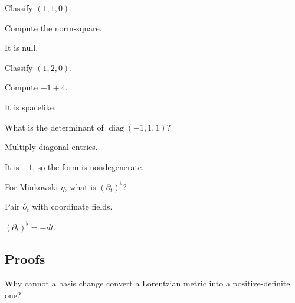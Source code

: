 \begin{exercise}\label{exr:vii29-ped-02}
Classify \((1,1,0)\).
\end{exercise}

\begin{hint}
Compute the norm-square.
\end{hint}

\begin{solution}
It is null.
\end{solution}

\begin{exercise}\label{exr:vii29-ped-03}
Classify \((1,2,0)\).
\end{exercise}

\begin{hint}
Compute \(-1+4\).
\end{hint}

\begin{solution}
It is spacelike.
\end{solution}

\begin{exercise}\label{exr:vii29-ped-04}
What is the determinant of \(\operatorname{diag}(-1,1,1)\)?
\end{exercise}

\begin{hint}
Multiply diagonal entries.
\end{hint}

\begin{solution}
It is \(-1\), so the form is nondegenerate.
\end{solution}

\begin{exercise}\label{exr:vii29-ped-05}
For Minkowski \(\eta\), what is \((\partial_t)^\flat\)?
\end{exercise}

\begin{hint}
Pair \(\partial_t\) with coordinate fields.
\end{hint}

\begin{solution}
\((\partial_t)^\flat=-dt\).
\end{solution}

\subsection*{Proofs}

\begin{exercise}\label{exr:vii29-ped-06}
Why cannot a basis change convert a Lorentzian metric into a positive-definite one?
\end{exercise}

